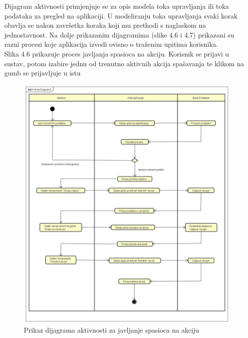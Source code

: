  	\begin{packed_item}
		\item	{Dijagram aktivnosti primjenjuje se za opis modela toka upravljanja ili toka podataka za pregled na aplikaciji. U modeliranju toka upravljanja svaki korak obavlja se nakon završetka koraka koji mu prethodi s naglaskom na jednostavnost. Na dolje prikazanim dijagramima (slike 4.6 i 4.7) prikazani su razni procesi koje aplikacija izvodi ovisno o traženim upitima korisnika.\\
			Slika 4.6 prikazuje proces javljanja spasioca na akciju. Korisnik se prijavi u sustav, potom izabire jednu od trenutno aktivnih akcija spašavanja te klikom na gumb se prijavljuje u istu}
		
		\begin{figure}[h!]
			\centering
			\includegraphics[width=\linewidth]{./slike/PrijavaNaAkciju.jpg}
			\caption{Prikaz dijagrama aktivnosti za javljanje spasioca na akciju}
			
		\end{figure}
		\eject
		
	\end{packed_item}
		\newpage
